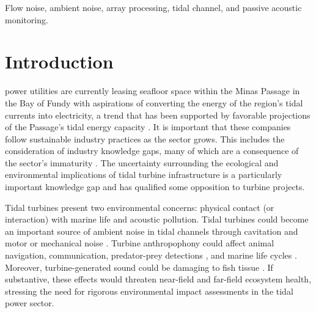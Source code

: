 \documentclass[12pt,journal,onecolumn]{IEEEtran}
\begin{document}
\begin{IEEEkeywords}
Flow noise, ambient noise, array processing, tidal channel, and passive acoustic monitoring.
\end{IEEEkeywords}






%
\IEEEpeerreviewmaketitle



\section{Introduction}
\label{I}
% 
% 
% 
% 
 power utilities are currently leasing seafloor space within the Minas Passage in the Bay of Fundy with aspirations of converting the energy of the region's tidal currents into electricity, a trend that has been supported by favorable projections of the Passage's tidal energy capacity \cite{karsten}. It is important that these companies follow sustainable industry practices as the sector grows. This includes the consideration of industry knowledge gaps, many of which are a consequence of the sector's immaturity \cite{inger}. The uncertainty surrounding the ecological and environmental implications of tidal turbine infrastructure is a particularly important knowledge gap and has qualified some opposition to turbine projects. 

Tidal turbines present two environmental concerns: physical contact (or interaction) with marine life \cite{dadswell} \cite{redden} and acoustic pollution. Tidal turbines could become an important source of ambient noise in tidal channels through cavitation and motor or mechanical noise \cite{wang}. %
Turbine anthropophony could affect animal navigation, communication, predator-prey detections \cite{lombardi}, and marine life cycles \cite{pine}. Moreover, turbine-generated sound could be damaging to fish tissue \cite{halvorsen}. If substantive, these effects would threaten near-field and far-field ecosystem health, stressing the need for rigorous environmental impact assessments in the tidal power sector. 
\end{document}
